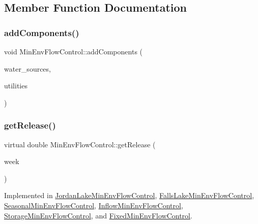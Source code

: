 \subsection{Member Function Documentation}
\mbox{\label{classMinEnvFlowControl_a4f849e1385f68c9d8f2835889f14a71f_a4f849e1385f68c9d8f2835889f14a71f}} 
\subsubsection{\texorpdfstring{add\+Components()}{addComponents()}}
{\footnotesize\ttfamily void Min\+Env\+Flow\+Control\+::add\+Components (\begin{DoxyParamCaption}\item[{vector$<$ \mbox{\hyperlink{classWaterSource}{Water\+Source}} $\ast$$>$}]{water\+\_\+sources,  }\item[{vector$<$ \mbox{\hyperlink{classUtility}{Utility}} $\ast$$>$}]{utilities }\end{DoxyParamCaption})}

\mbox{\label{classMinEnvFlowControl_a5de79615852eb0c937dd559a9eb9402d_a5de79615852eb0c937dd559a9eb9402d}} 
\subsubsection{\texorpdfstring{get\+Release()}{getRelease()}}
{\footnotesize\ttfamily virtual double Min\+Env\+Flow\+Control\+::get\+Release (\begin{DoxyParamCaption}\item[{int}]{week }\end{DoxyParamCaption})\hspace{0.3cm}{\ttfamily [pure virtual]}}



Implemented in \mbox{\hyperlink{classJordanLakeMinEnvFlowControl_a5c2456c26fa141824c247cd15bf5c57d_a5c2456c26fa141824c247cd15bf5c57d}{Jordan\+Lake\+Min\+Env\+Flow\+Control}}, \mbox{\hyperlink{classFallsLakeMinEnvFlowControl_a50453b443fb6e5869fcfc9a183f42b2f_a50453b443fb6e5869fcfc9a183f42b2f}{Falls\+Lake\+Min\+Env\+Flow\+Control}}, \mbox{\hyperlink{classSeasonalMinEnvFlowControl_a5c5ddcab367812bdd2e23b383449d202_a5c5ddcab367812bdd2e23b383449d202}{Seasonal\+Min\+Env\+Flow\+Control}}, \mbox{\hyperlink{classInflowMinEnvFlowControl_a91bf5813168a995bd4ddf9e0ff553112_a91bf5813168a995bd4ddf9e0ff553112}{Inflow\+Min\+Env\+Flow\+Control}}, \mbox{\hyperlink{classStorageMinEnvFlowControl_ae78055a8be7ad9e119384958ef88e174_ae78055a8be7ad9e119384958ef88e174}{Storage\+Min\+Env\+Flow\+Control}}, and \mbox{\hyperlink{classFixedMinEnvFlowControl_af3ef98eef6a7124738a3b54dcadf757f_af3ef98eef6a7124738a3b54dcadf757f}{Fixed\+Min\+Env\+Flow\+Control}}.

